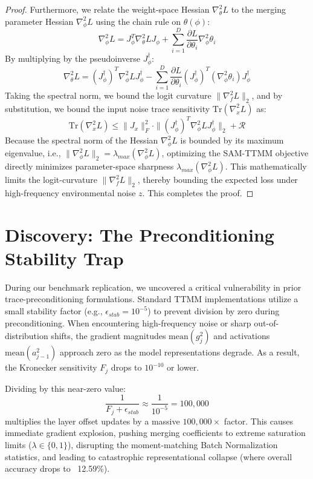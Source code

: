 \documentclass{article}
\theoremstyle{plain}
\theoremstyle{definition}
\theoremstyle{remark}
\begin{document}
\begin{proof}
Furthermore, we relate the weight-space Hessian $\nabla_\theta^2 L$ to the merging parameter Hessian $\nabla_\phi^2 L$ using the chain rule on $\theta(\phi)$:
\begin{equation}
    \nabla_\phi^2 L = J_\phi^T \nabla_\theta^2 L J_\phi + \sum_{i=1}^D \frac{\partial L}{\partial \theta_i} \nabla_\phi^2 \theta_i
\end{equation}
By multiplying by the pseudoinverse $J_\phi^\dagger$:
\begin{equation}
    \nabla_\theta^2 L = (J_\phi^\dagger)^T \nabla_\phi^2 L J_\phi^\dagger - \sum_{i=1}^D \frac{\partial L}{\partial \theta_i} (J_\phi^\dagger)^T \left( \nabla_\phi^2 \theta_i \right) J_\phi^\dagger
\end{equation}
Taking the spectral norm, we bound the logit curvature $\|\nabla_f^2 L\|_2$, and by substitution, we bound the input noise trace sensitivity $\text{Tr}(\nabla_x^2 L)$ as:
\begin{equation}
    \text{Tr}(\nabla_x^2 L) \le \|J_x\|_F^2 \cdot \|(J_\phi^\dagger)^T \nabla_\phi^2 L J_\phi^\dagger\|_2 + \mathcal{R}
\end{equation}
Because the spectral norm of the Hessian $\nabla_\phi^2 L$ is bounded by its maximum eigenvalue, i.e., $\|\nabla_\phi^2 L\|_2 = \lambda_{max}(\nabla_\phi^2 L)$, optimizing the SAM-TTMM objective directly minimizes parameter-space sharpness $\lambda_{max}(\nabla_\phi^2 L)$. This mathematically limits the logit-curvature $\|\nabla_f^2 L\|_2$, thereby bounding the expected loss under high-frequency environmental noise $z$. This completes the proof.
\end{proof}

\section{Discovery: The Preconditioning Stability Trap}
\label{sec:trap}
During our benchmark replication, we uncovered a critical vulnerability in prior trace-preconditioning formulations. Standard TTMM implementations utilize a small stability factor (e.g., $\epsilon_{stab} = 10^{-5}$) to prevent division by zero during preconditioning. When encountering high-frequency noise or sharp out-of-distribution shifts, the gradient magnitudes $\text{mean}(g_j^2)$ and activations $\text{mean}(a_{j-1}^2)$ approach zero as the model representations degrade. As a result, the Kronecker sensitivity $F_j$ drops to $10^{-10}$ or lower.

Dividing by this near-zero value:
\begin{equation}
    \frac{1}{F_j + \epsilon_{stab}} \approx \frac{1}{10^{-5}} = 100,000
\end{equation}
multiplies the layer offset updates by a massive $100,000\times$ factor. This causes immediate gradient explosion, pushing merging coefficients to extreme saturation limits ($\lambda \in \{0, 1\}$), disrupting the moment-matching Batch Normalization statistics, and leading to catastrophic representational collapse (where overall accuracy drops to ~12.59\%).
\end{document}
